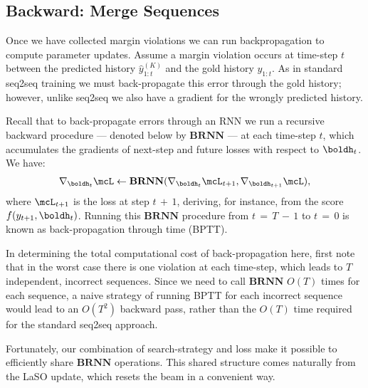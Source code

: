 \documentclass[11pt,letterpaper]{article}
\newcommand{\BRNN}{\mathrm{\mathbf{BRNN}}}
\newcommand{\goldpfx}[1]{\ensuremath{y_{1:{#1}}}}
\newcommand{\beampred}[2]{\ensuremath{\hat{y}_{1:{#1}}^{({#2})}}}
\newcommand{\niceq}{\ensuremath{\,{=}\,}}
\begin{document}
\subsection{Backward: Merge Sequences}
Once we have collected margin violations we can run backpropagation to compute parameter updates. Assume a
margin violation occurs at time-step $t$ between the predicted history
$\beampred{t}{K}$ and the gold history $\goldpfx{t}$. As in standard
seq2seq training we must back-propagate this error through the gold
history; however, unlike seq2seq we also have a gradient for the
wrongly predicted history.

Recall that to back-propagate errors through an RNN we run a recursive backward procedure --- denoted below by $\BRNN$ --- at each time-step $t$, which accumulates the 
gradients of next-step and future losses with respect to $\boldh_t$. We have: 
\begin{align*}
\nabla_{\boldh_t} \mcL \gets \BRNN(\nabla_{\boldh_t} \mcL_{t+1},\nabla_{\boldh_{t+1}} \mcL),
\end{align*} 
where $\mcL_{t+1}$ is the loss at step $t \, {+} \, 1$, deriving, for instance, from the score $f(y_{t+1}, \boldh_{t})$.
Running this $\BRNN$ procedure from $t \niceq T \, {-} \,1$ to $t \niceq 0$ is known as back-propagation through time (BPTT).

In determining the total computational cost of back-propagation here, first note that in the worst case there is one violation at each time-step, which
leads to $T$ independent, incorrect sequences. Since we need to call $\BRNN$
$O(T)$ times for each sequence, a naive strategy of running BPTT for each incorrect sequence would lead to an $O(T^2)$ backward pass, rather than the $O(T)$ time required for the standard seq2seq approach. 

Fortunately, our combination of search-strategy and loss make it
possible to efficiently share $\BRNN$ operations. This shared
structure comes naturally from the LaSO update, which resets the beam in a convenient way. 
\end{document}

